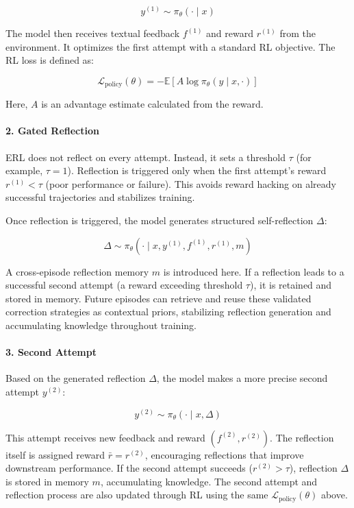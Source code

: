 \[
y^{(1)}\sim\pi_\theta(\cdot\mid x)
\]

The model then receives textual feedback \(f^{(1)}\) and reward \(r^{(1)}\) from the environment. It optimizes the first attempt with a standard RL objective. The RL loss is defined as:

\[
\mathcal{L}_{\mathrm{policy}}(\theta)=-\mathbb{E}\left[A\log\pi_\theta(y\mid x,\cdot)\right]
\]

Here, \(A\) is an advantage estimate calculated from the reward.

\hypertarget{gated-reflection}{%
\paragraph{2. Gated Reflection}\label{gated-reflection}}

ERL does not reflect on every attempt. Instead, it sets a threshold \(\tau\) (for example, \(\tau=1\)). Reflection is triggered only when the first attempt's reward \(r^{(1)}\lt\tau\) (poor performance or failure). This avoids reward hacking on already successful trajectories and stabilizes training.

Once reflection is triggered, the model generates structured self-reflection \(\Delta\):

\[
\Delta\sim\pi_\theta(\cdot\mid x,y^{(1)},f^{(1)},r^{(1)},m)
\]

A cross-episode reflection memory \(m\) is introduced here. If a reflection leads to a successful second attempt (a reward exceeding threshold \(\tau\)), it is retained and stored in memory. Future episodes can retrieve and reuse these validated correction strategies as contextual priors, stabilizing reflection generation and accumulating knowledge throughout training.

\hypertarget{second-attempt}{%
\paragraph{3. Second Attempt}\label{second-attempt}}

Based on the generated reflection \(\Delta\), the model makes a more precise second attempt \(y^{(2)}\):

\[
y^{(2)}\sim\pi_\theta(\cdot\mid x,\Delta)
\]

This attempt receives new feedback and reward \((f^{(2)},r^{(2)})\). The reflection itself is assigned reward \(\bar{r}=r^{(2)}\), encouraging reflections that improve downstream performance. If the second attempt succeeds (\(r^{(2)}\gt\tau\)), reflection \(\Delta\) is stored in memory \(m\), accumulating knowledge. The second attempt and reflection process are also updated through RL using the same \(\mathcal{L}_{\mathrm{policy}}(\theta)\) above.


